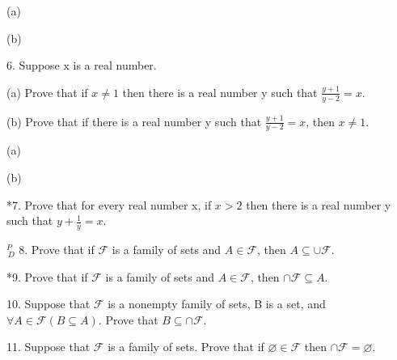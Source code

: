\documentclass{article}
\begin{document}
(a)

\vspace{20pt}

(b)

\vspace{30pt}

6. Suppose x is a real number.

\hspace{12pt}(a) Prove that if $x \neq 1$ then there is a real number y such that $\frac{y+1}{y-2} = x$.

\hspace{12pt}(b) Prove that if there is a real number y such that $\frac{y+1}{y-2} = x$, then $x \neq 1$.
\vspace{30pt}

(a)

\vspace{20pt}

(b)

\vspace{30pt}

*7. Prove that for every real number x, if $x > 2$ then there is a real number
y such that $y + \frac{1}{y} = x$.
\vspace{30pt}



\vspace{30pt}

$^{\textit{P}}_{\, \textit{D}}$ 8. Prove that if $\mathcal{F}$ is a family of sets and $A \in \mathcal{F}$, then $A \subseteq \cup \mathcal{F}$.
\vspace{30pt}



\vspace{30pt}

*9. Prove that if $\mathcal{F}$ is a family of sets and $A \in \mathcal{F}$, then $\cap \mathcal{F} \subseteq A$.
\vspace{30pt}



\vspace{30pt}

10. Suppose that $\mathcal{F}$ is a nonempty family of sets, B is a set, and $\forall A \in \mathcal{F}(B \subseteq A)$. Prove that $B \subseteq \cap \mathcal{F}$.
\vspace{30pt}



\vspace{30pt}

11. Suppose that $\mathcal{F}$ is a family of sets. Prove that if $\varnothing \in \mathcal{F}$ then $\cap \mathcal{F} = \varnothing$.
\vspace{30pt}
\end{document}
